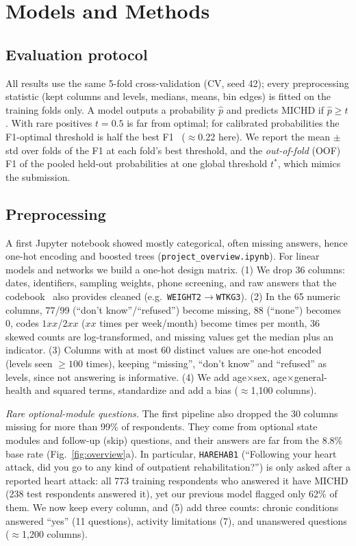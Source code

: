 \documentclass[10pt,conference,compsocconf]{IEEEtran}
\newcommand{\hare}{\texttt{HAREHAB1}}
\begin{document}
\section{Models and Methods}

\subsection{Evaluation protocol}
\label{sec:protocol}
All results use the same 5-fold cross-validation (CV, seed 42); every preprocessing statistic (kept columns and levels, medians, means, bin edges) is fitted on the training folds only.
A model outputs a probability $\hat p$ and predicts MICHD if $\hat p\ge t$.
With rare positives $t=0.5$ is far from optimal; for calibrated probabilities the F1-optimal threshold is half the best F1~\cite{lipton2014} ($\approx$0.22 here).
We report the mean $\pm$ std over folds of the F1 at each fold's best threshold, and the \emph{out-of-fold} (OOF) F1 of the pooled held-out probabilities at one global threshold $t^\ast$, which mimics the submission.

\subsection{Preprocessing}
\label{sec:prep}
A first Jupyter notebook showed mostly categorical, often missing answers, hence one-hot encoding and boosted trees (\texttt{project\_overview.ipynb}).
For linear models and networks we build a one-hot design matrix.
(1) We drop 36 columns: dates, identifiers, sampling weights, phone screening, and raw answers that the codebook~\cite{brfss2015} also provides cleaned (e.g.\ \texttt{WEIGHT2}$\to$\texttt{WTKG3}).
(2) In the 65 numeric columns, 77/99 (``don't know''/``refused'') become missing, 88 (``none'') becomes 0, codes $1xx$/$2xx$ ($xx$ times per week/month) become times per month, 36 skewed counts are log-transformed, and missing values get the median plus an indicator.
(3) Columns with at most 60 distinct values are one-hot encoded (levels seen $\ge100$ times), keeping ``missing'', ``don't know'' and ``refused'' as levels, since not answering is informative.
(4) We add age$\times$sex, age$\times$general-health and squared terms, standardize and add a bias ($\approx$1{,}100 columns).

\emph{Rare optional-module questions.} The first pipeline also dropped the 30 columns missing for more than 99\% of respondents.
They come from optional state modules and follow-up (skip) questions, and their answers are far from the 8.8\% base rate (Fig.~\ref{fig:overview}a).
In particular, \hare{} (``Following your heart attack, did you go to any kind of outpatient rehabilitation?'') is only asked after a reported heart attack: all 773 training respondents who answered it have MICHD (238 test respondents answered it), yet our previous model flagged only 62\% of them.
We now keep every column, and (5) add three counts: chronic conditions answered ``yes'' (11 questions), activity limitations (7), and unanswered questions ($\approx$1{,}200 columns).
\end{document}
